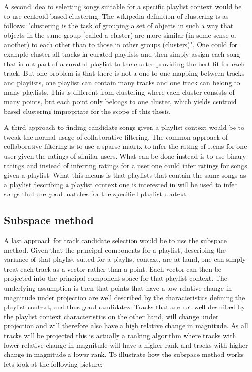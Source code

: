 \documentclass[a4paper,11pt]{kth-mag}
\begin{document}
A second idea to selecting songs suitable for a specific playlist context would be to use centroid based clustering. The wikipedia definition of clustering is as follows: "clustering is the task of grouping a set of objects in such a way that objects in the same group (called a cluster) are more similar (in some sense or another) to each other than to those in other groups (clusters)". One could for example cluster all tracks in curated playlists and then simply assign each song that is not part of a curated playlist to the cluster providing the best fit for each track. But one problem is that there is not a one to one mapping between tracks and playlists, one playlist can contain many tracks and one track can belong to many playlists. This is different from clustering where each cluster consists of many points, but each point only belongs to one cluster, which yields centroid based clustering impropriate for the scope of this thesis. 

A third approach to finding candidate songs given a playlist context would be to tweak the normal usage of collaborative filtering. The common approach of collaborative filtering is to use a sparse matrix to infer the rating of items for one user given the ratings of similar users. What can be done instead is to use binary ratings and instead of inferring ratings for a user one could infer ratings for songs given a playlist. What this means is that playlists that contain the same songs as a playlist describing a playlist context one is interested in will be used to infer songs that are good matches for the specified playlist context. 

\subsection{Subspace method}
A last approach for track candidate selection would be to use the subspace method. Given that the principal components for a playlist, describing the variance of that playlist suited for a playlist context, are at hand, one can simply treat each track as a vector rather than a point. Each vector can then be projected into the principal component space for that playlist context. The underlying assumption is then that points that have a low relative change in magnitude under projection are well described by the characteristics defining the playlist context, and thus good candidates. Tracks that are not well described by the playlist context characteristics on the other hand, will change under projection and will therefore also have a high relative change in magnitude. As all tracks will be projected this is actually a ranking algorithm where tracks with lower relative change in magnitude will have a higher rank and tracks with higher change in magnitude a lower rank. To illustrate how the subspace method works lets look at the following picture:
\end{document}
